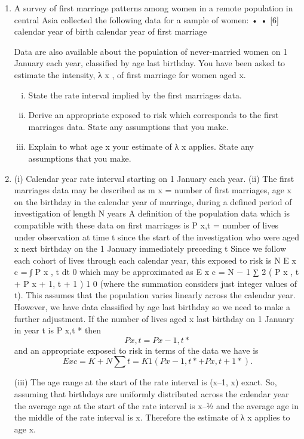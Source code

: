 \documentclass[a4paper,12pt]{article}
\begin{document}
\begin{enumerate}

\item A survey of first marriage patterns among women in a remote population in central Asia collected the following data for a sample of women:
•
•
[6]
calendar year of birth
calendar year of first marriage

Data are also available about the population of never-married women on 1 January each year, classified by age last birthday.
You have been asked to estimate the intensity, λ x , of first marriage for women aged x.
\begin{enumerate}[(i)] 
\item State the rate interval implied by the first marriages data. 
\item Derive an appropriate exposed to risk which corresponds to the first marriages data. State any assumptions that you make. 
\item Explain to what age x your estimate of λ x applies. State any assumptions that you make.
\end{enumerate}

\item 
(i) Calendar year rate interval starting on 1 January each year.
(ii) The first marriages data may be described as m x = number of first marriages, age x on the birthday in the
calendar year of marriage, during a defined period of investigation of length N years A definition of the population data which is compatible with these data on first marriages is
P x,t = number of lives under observation at time t since the start of the investigation who were aged x next birthday on the 1 January
immediately preceding t Since we follow each cohort of lives through each calendar year, this exposed
to risk is
N
E x c
=
∫ P x , t dt
0
which may be approximated as
E x c =
N − 1
∑ 2 ( P x , t + P x + 1, t + 1 )
1
0
(where the summation considers just integer values of t). This assumes that the population varies linearly across the
calendar year. However, we have data classified by age last birthday so we need to make a further adjustment.
If the number of lives aged x last birthday on 1 January in year t is P x,t * then
\[P x,t = P x-1,t *\]
and an appropriate exposed to risk in terms of the data we
have is
\[ E x c =
K + N
∑
t = K
1
( P x − 1, t * + P x , t + 1 * ) .\]

(iii)
The age range at the start of the rate interval is (x–1, x) exact.
So, assuming that birthdays are uniformly distributed across the calendar year the average age at the start of the rate interval is
x–1⁄2 and the average age in the middle of the rate interval is x.
Therefore the estimate of λ x applies to age x.
\end{enumerate}
\end{document}
